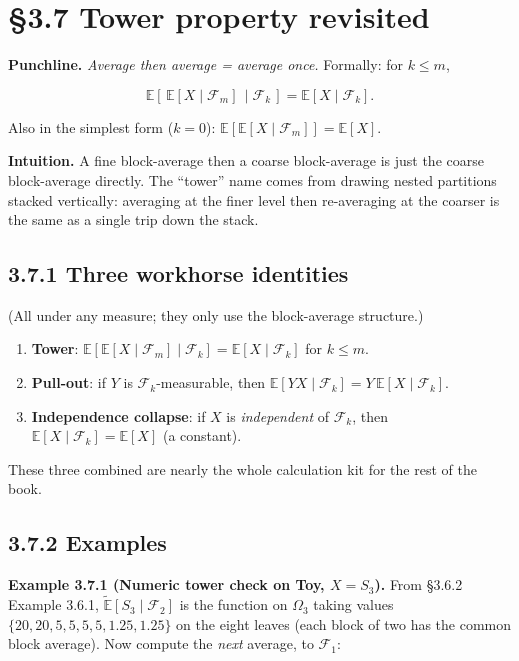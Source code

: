 \documentclass[
  10pt,
  twoside]{book}
\providecommand{\tightlist}{%
  \setlength{\itemsep}{0pt}\setlength{\parskip}{0pt}}
\begin{document}
\section{§3.7 Tower property revisited}\label{tower-property-revisited}

\textbf{Punchline.} \emph{Average then average = average once.}
Formally: for \(k \le m\),

\[\mathbb E[\,\mathbb E[X \mid \mathcal F_m]\,\mid \mathcal F_k\,] = \mathbb E[X \mid \mathcal F_k].\]

Also in the simplest form (\(k = 0\)):
\(\mathbb E[\mathbb E[X \mid \mathcal F_m]] = \mathbb E[X]\).

\textbf{Intuition.} A fine block-average then a coarse block-average is
just the coarse block-average directly. The ``tower'' name comes from
drawing nested partitions stacked vertically: averaging at the finer
level then re-averaging at the coarser is the same as a single trip down
the stack.

\subsection{3.7.1 Three workhorse
identities}\label{three-workhorse-identities}

(All under any measure; they only use the block-average structure.)

\begin{enumerate}
\def\labelenumi{\arabic{enumi}.}
\tightlist
\item
  \textbf{Tower}:
  \(\mathbb E[\mathbb E[X\mid\mathcal F_m]\mid\mathcal F_k] = \mathbb E[X\mid\mathcal F_k]\)
  for \(k \le m\).
\item
  \textbf{Pull-out}: if \(Y\) is \(\mathcal F_k\)-measurable, then
  \(\mathbb E[YX \mid \mathcal F_k] = Y\,\mathbb E[X\mid\mathcal F_k]\).
\item
  \textbf{Independence collapse}: if \(X\) is \emph{independent} of
  \(\mathcal F_k\), then \(\mathbb E[X\mid\mathcal F_k] = \mathbb E[X]\)
  (a constant).
\end{enumerate}

These three combined are nearly the whole calculation kit for the rest
of the book.

\subsection{3.7.2 Examples}\label{examples-17}

\textbf{Example 3.7.1 (Numeric tower check on Toy, \(X = S_3\)).} From
§3.6.2 Example 3.6.1, \(\tilde{\mathbb E}[S_3 \mid \mathcal F_2]\) is
the function on \(\Omega_3\) taking values
\(\{20, 20, 5, 5, 5, 5, 1.25, 1.25\}\) on the eight leaves (each block
of two has the common block average). Now compute the \emph{next}
average, to \(\mathcal F_1\):
\end{document}
